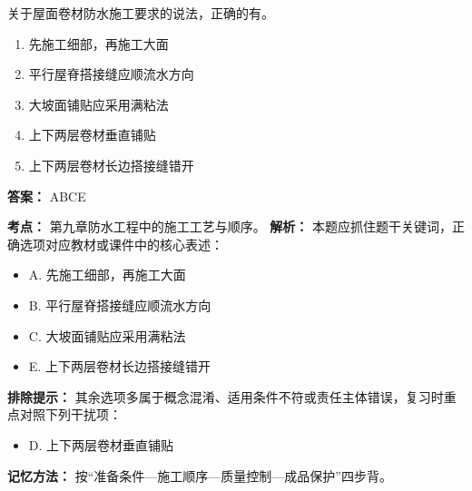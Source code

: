 \documentclass[UTF8,fontset=fandol,11pt]{ctexart}
\begin{document}
\begin{quizbox}[title={第 4 题}]
关于屋面卷材防水施工要求的说法，正确的有。\\
\begin{enumerate}[label=\Alph*.]
\item 先施工细部，再施工大面
\item 平行屋脊搭接缝应顺流水方向
\item 大坡面铺贴应采用满粘法
\item 上下两层卷材垂直铺贴
\item 上下两层卷材长边搭接缝错开
\end{enumerate}
\textbf{答案：} ABCE
\vspace{0.25em}
\begin{answerbox}[title={考点解析}]
\textbf{考点：} 第九章防水工程中的施工工艺与顺序。
\textbf{解析：} 本题应抓住题干关键词，正确选项对应教材或课件中的核心表述：
\begin{itemize}
\item A. 先施工细部，再施工大面
\item B. 平行屋脊搭接缝应顺流水方向
\item C. 大坡面铺贴应采用满粘法
\item E. 上下两层卷材长边搭接缝错开
\end{itemize}
\textbf{排除提示：} 其余选项多属于概念混淆、适用条件不符或责任主体错误，复习时重点对照下列干扰项：
\begin{itemize}
\item D. 上下两层卷材垂直铺贴
\end{itemize}
\textbf{记忆方法：} 按“准备条件—施工顺序—质量控制—成品保护”四步背。
\end{answerbox}
\end{quizbox}

\vspace{0.2em}
\end{document}
